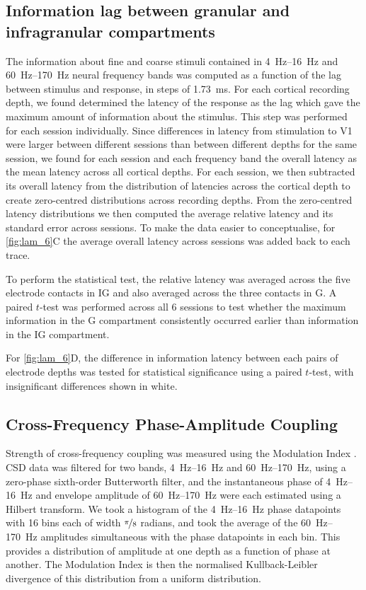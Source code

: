 \subsection{Information lag between granular and infragranular compartments}

The information about fine and coarse stimuli contained in \SIrange{4}{16}{Hz} and \SIrange{60}{170}{Hz} neural frequency bands was computed as a function of the lag between stimulus and response, in steps of \SI{1.73}{\milli\second}.
For each cortical recording depth, we found determined the latency of the response as the lag which gave the maximum amount of information about the stimulus.
This step was performed for each session individually.
Since differences in latency from stimulation to \ac{V1} were larger between different sessions than between different depths for the same session, we found for each session and each frequency band the overall latency as the mean latency across all cortical depths.
For each session, we then subtracted its overall latency from the distribution of latencies across the cortical depth to create zero-centred distributions across recording depths.
From the zero-centred latency distributions we then computed the average relative latency and its standard error across sessions.
To make the data easier to conceptualise, for \autoref{fig:lam_6}C the average overall latency across sessions was added back to each trace.

To perform the statistical test, the relative latency was averaged across the five electrode contacts in \ac{IG} and also averaged across the three contacts in \ac{G}.
A paired $t$-test was performed across all \num{6} sessions to test whether the maximum information in the \ac{G} compartment consistently occurred earlier than information in the \ac{IG} compartment.

For \autoref{fig:lam_6}D, the difference in information latency between each pairs of electrode depths was tested for statistical significance using a paired $t$-test, with insignificant differences shown in white.


\subsection{Cross-Frequency Phase-Amplitude Coupling}

Strength of cross-frequency coupling was measured using the Modulation Index \citep{Tort2010}.
\ac{CSD} data was filtered for two bands, \SIrange{4}{16}{Hz} and \SIrange{60}{170}{Hz}, using a zero-phase sixth-order Butterworth filter, and the instantaneous phase of \SIrange{4}{16}{Hz} and envelope amplitude of \SIrange{60}{170}{Hz} were each estimated using a Hilbert transform.
We took a histogram of the \SIrange{4}{16}{Hz} phase datapoints with \num{16} bins each of width $\nicefrac{\pi}{8}$ radians, and took the average of the \SIrange{60}{170}{Hz} amplitudes simultaneous with the phase datapoints in each bin.
This provides a distribution of amplitude at one depth as a function of phase at another.
The Modulation Index is then the normalised Kullback-Leibler divergence of this distribution from a uniform distribution.


